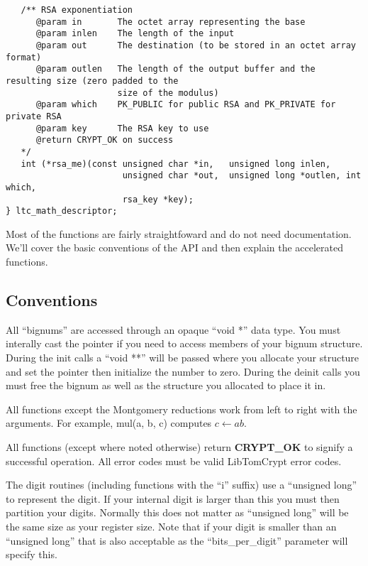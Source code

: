 \documentclass[a4paper]{book}
\begin{document}
\begin{small}
\begin{verbatim}
   /** RSA exponentiation
      @param in       The octet array representing the base
      @param inlen    The length of the input
      @param out      The destination (to be stored in an octet array format)
      @param outlen   The length of the output buffer and the resulting size (zero padded to the 
                      size of the modulus)
      @param which    PK_PUBLIC for public RSA and PK_PRIVATE for private RSA
      @param key      The RSA key to use 
      @return CRYPT_OK on success
   */
   int (*rsa_me)(const unsigned char *in,   unsigned long inlen,
                       unsigned char *out,  unsigned long *outlen, int which,
                       rsa_key *key);
} ltc_math_descriptor;
\end{verbatim}
\end{small}

Most of the functions are fairly straightfoward and do not need documentation.  We'll cover the basic conventions of the API and then explain the accelerated functions.

\subsection{Conventions}

All ``bignums'' are accessed through an opaque ``void *'' data type.  You must interally cast the pointer if you need to access members of your bignum structure.  During
the init calls a ``void **'' will be passed where you allocate your structure and set the pointer then initialize the number to zero.  During the deinit calls you must 
free the bignum as well as the structure you allocated to place it in.

All functions except the Montgomery reductions work from left to right with the arguments.  For example, mul(a, b, c) computes $c \leftarrow ab$.  

All functions (except where noted otherwise) return \textbf{CRYPT\_OK} to signify a successful operation.  All error codes must be valid LibTomCrypt error codes.

The digit routines (including functions with the ``i'' suffix) use a ``unsigned long'' to represent the digit.  If your internal digit is larger than this you must
then partition your digits.  Normally this does not matter as ``unsigned long'' will be the same size as your register size.  Note that if your digit is smaller
than an ``unsigned long'' that is also acceptable as the ``bits\_per\_digit'' parameter will specify this.  
\end{document}
